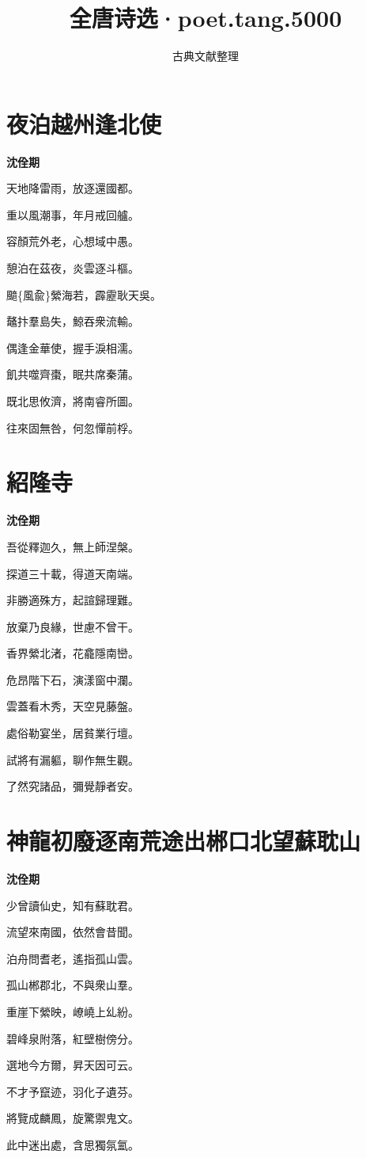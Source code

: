 \documentclass[12pt,a4paper]{ctexbook}
\title{全唐诗选·poet.tang.5000}
\author{古典文献整理}
\date{}
\begin{document}
\maketitle
\tableofcontents
\newpage
\section{夜泊越州逢北使}
\textbf{沈佺期}\par\vspace{0.5em}
天地降雷雨，放逐還國都。\par
重以風潮事，年月戒回艫。\par
容顏荒外老，心想域中愚。\par
憩泊在茲夜，炎雲逐斗樞。\par
䬓\{風兪\}縈海若，霹靂耿天吳。\par
鼇抃羣島失，鯨吞衆流輸。\par
偶逢金華使，握手淚相濡。\par
飢共噬齊棗，眠共席秦蒲。\par
既北思攸濟，將南睿所圖。\par
往來固無咎，何忽憚前桴。\par

\section{紹隆寺}
\textbf{沈佺期}\par\vspace{0.5em}
吾從釋迦久，無上師涅槃。\par
探道三十載，得道天南端。\par
非勝適殊方，起諠歸理難。\par
放棄乃良緣，世慮不曾干。\par
香界縈北渚，花龕隱南巒。\par
危昂階下石，演漾窗中瀾。\par
雲蓋看木秀，天空見藤盤。\par
處俗勒宴坐，居貧業行壇。\par
試將有漏軀，聊作無生觀。\par
了然究諸品，彌覺靜者安。\par

\section{神龍初廢逐南荒途出郴口北望蘇耽山}
\textbf{沈佺期}\par\vspace{0.5em}
少曾讀仙史，知有蘇耽君。\par
流望來南國，依然會昔聞。\par
泊舟問耆老，遙指孤山雲。\par
孤山郴郡北，不與衆山羣。\par
重崖下縈映，嶛嶢上乣紛。\par
碧峰泉附落，紅壁樹傍分。\par
選地今方爾，昇天因可云。\par
不才予竄迹，羽化子遺芬。\par
將覽成麟鳳，旋驚禦鬼文。\par
此中迷出處，含思獨氛氳。\par
\end{document}
